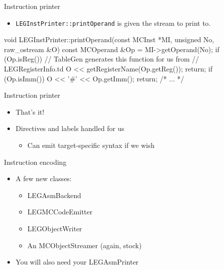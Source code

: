 
\begin{frame}[fragile]{Instruction printer}

\begin{itemize}
    \item \texttt{LEGInstPrinter::printOperand} is given the stream to print to.
\end{itemize}

\begin{codebox}
void LEGInstPrinter::printOperand(const MCInst *MI, unsigned No,
                                  raw_ostream &O) {
  const MCOperand &Op = MI->getOperand(No);
  if (Op.isReg()) {
    // TableGen generates this function for us from   
    // LEGRegisterInfo.td
    O << getRegisterName(Op.getReg());
    return;
  }
  if (Op.isImm()) {
    O << '#' << Op.getImm();
    return;
  }
  /* ... */
}
\end{codebox}

\end{frame}


\begin{frame}{Instruction printer}

\begin{itemize}
    \item That's it!
    \item Directives and labels handled for us
    \begin{itemize}
        \item Can emit target-specific syntax if we wish
    \end{itemize}
\end{itemize}


\end{frame}



\begin{frame}{Instruction encoding}

\begin{itemize}
    \item A few new classes:
    \begin{itemize}
        \item LEGAsmBackend
        \item LEGMCCodeEmitter
        \item LEGObjectWriter
        \item An MCObjectStreamer (again, stock)
    \end{itemize}
    \item You will also need your LEGAsmPrinter
\end{itemize}

\end{frame}

